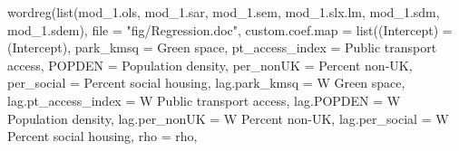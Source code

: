 \documentclass[
  letterpaper,
  DIV=11,
  numbers=noendperiod]{scrreprt}
\newenvironment{Shaded}{\begin{snugshade}}{\end{snugshade}}
\newcommand{\AttributeTok}[1]{\textcolor[rgb]{0.40,0.45,0.13}{#1}}
\newcommand{\FunctionTok}[1]{\textcolor[rgb]{0.28,0.35,0.67}{#1}}
\newcommand{\NormalTok}[1]{\textcolor[rgb]{0.00,0.23,0.31}{#1}}
\newcommand{\OtherTok}[1]{\textcolor[rgb]{0.00,0.23,0.31}{#1}}
\newcommand{\StringTok}[1]{\textcolor[rgb]{0.13,0.47,0.30}{#1}}
\begin{document}
\begin{Shaded}
\begin{Highlighting}[]
\FunctionTok{wordreg}\NormalTok{(}\FunctionTok{list}\NormalTok{(mod\_1.ols, mod\_1.sar, mod\_1.sem, mod\_1.slx.lm, mod\_1.sdm, mod\_1.sdem),}
        \AttributeTok{file =} \StringTok{"fig/Regression.doc"}\NormalTok{,}
          \AttributeTok{custom.coef.map =} \FunctionTok{list}\NormalTok{(}\StringTok{\textquotesingle{}(Intercept)\textquotesingle{}} \OtherTok{=}  \StringTok{\textquotesingle{}(Intercept)\textquotesingle{}}\NormalTok{,}
                                 \StringTok{\textquotesingle{}park\_kmsq\textquotesingle{}} \OtherTok{=}  \StringTok{\textquotesingle{}Green space\textquotesingle{}}\NormalTok{,}
                                 \StringTok{\textquotesingle{}pt\_access\_index\textquotesingle{}} \OtherTok{=}  \StringTok{\textquotesingle{}Public transport access\textquotesingle{}}\NormalTok{,}
                                 \StringTok{\textquotesingle{}POPDEN\textquotesingle{}} \OtherTok{=}  \StringTok{\textquotesingle{}Population density\textquotesingle{}}\NormalTok{,}
                                 \StringTok{\textquotesingle{}per\_nonUK\textquotesingle{}} \OtherTok{=}  \StringTok{\textquotesingle{}Percent non{-}UK\textquotesingle{}}\NormalTok{,}
                                 \StringTok{\textquotesingle{}per\_social\textquotesingle{}} \OtherTok{=} \StringTok{\textquotesingle{}Percent social housing\textquotesingle{}}\NormalTok{,}
                                 \StringTok{\textquotesingle{}lag.park\_kmsq\textquotesingle{}} \OtherTok{=}  \StringTok{\textquotesingle{}W Green space\textquotesingle{}}\NormalTok{,}
                                 \StringTok{\textquotesingle{}lag.pt\_access\_index\textquotesingle{}} \OtherTok{=}  \StringTok{\textquotesingle{}W Public transport access\textquotesingle{}}\NormalTok{,}
                                 \StringTok{\textquotesingle{}lag.POPDEN\textquotesingle{}} \OtherTok{=}  \StringTok{\textquotesingle{}W Population density\textquotesingle{}}\NormalTok{,}
                                 \StringTok{\textquotesingle{}lag.per\_nonUK\textquotesingle{}} \OtherTok{=}  \StringTok{\textquotesingle{}W Percent non{-}UK\textquotesingle{}}\NormalTok{,}
                                 \StringTok{\textquotesingle{}lag.per\_social\textquotesingle{}} \OtherTok{=} \StringTok{\textquotesingle{}W Percent social housing\textquotesingle{}}\NormalTok{,}
                                 \StringTok{\textquotesingle{}rho\textquotesingle{}} \OtherTok{=} \StringTok{\textquotesingle{}rho\textquotesingle{}}\NormalTok{,}

\end{Highlighting}
\end{Shaded}
\end{document}
